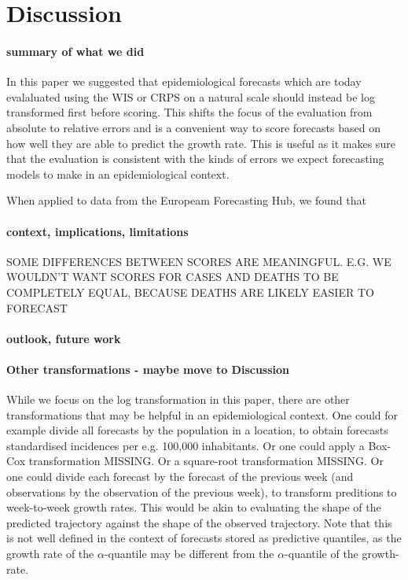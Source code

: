 \documentclass{article}
\begin{document}
\section{Discussion}

\paragraph{summary of what we did}
In this paper we suggested that epidemiological forecasts which are today evalaluated using the WIS or CRPS on a natural scale should instead be log transformed first before scoring. This shifts the focus of the evaluation from absolute to relative errors and is a convenient way to score forecasts based on how well they are able to predict the growth rate. This is useful as it makes sure that the evaluation is consistent with the kinds of errors we expect forecasting models to make in an epidemiological context. 

When applied to data from the Europeam Forecasting Hub, we found that 

\paragraph{context, implications, limitations}

SOME DIFFERENCES BETWEEN SCORES ARE MEANINGFUL. E.G. WE WOULDN'T WANT SCORES FOR CASES AND DEATHS TO BE COMPLETELY EQUAL, BECAUSE DEATHS ARE LIKELY EASIER TO FORECAST

\paragraph{outlook, future work}

\paragraph{Other transformations - maybe move to Discussion}
While we focus on the log transformation in this paper, there are other transformations that may be helpful in an epidemiological context. One could for example divide all forecasts by the population in a location, to obtain forecasts standardised incidences per e.g. 100,000 inhabitants. 
Or one could apply a Box-Cox transformation MISSING. 
Or a square-root transformation MISSING. 
Or one could divide each forecast by the forecast of the previous week (and observations by the observation of the previous week), to transform preditions to week-to-week growth rates. This would be akin to evaluating the shape of the predicted trajectory against the shape of the observed trajectory. Note that this is not well defined in the context of forecasts stored as predictive quantiles, as the growth rate of the $\alpha$-quantile may be different from the $\alpha$-quantile of the growth-rate. 
\end{document}

